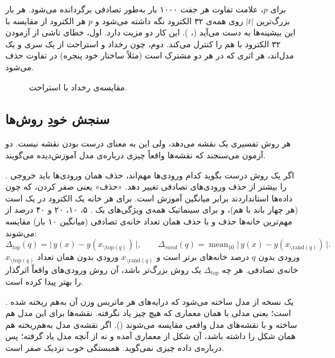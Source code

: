 برای $p$، علامت تفاوت هر جفت ۱۰۰۰ بار به‌طور تصادفی برگردانده می‌شود. هر بار بزرگ‌ترین $|t|$ روی همه‌ی ۳۲ الکترود نگه داشته می‌شود و $p$ هر الکترود از مقایسه با این بیشینه‌ها به دست می‌آید (، \cite{nichols2002}). این کار دو مزیت دارد. اول، خطای ناشی از آزمودن ۳۲ الکترود با هم را کنترل می‌کند. دوم، چون رخداد و استراحت از یک سری و یک مدل‌اند، هر اثری که در هر دو مشترک است (مثلاً ساختار خود پنجره) در تفاوت حذف می‌شود.

\begin{figure}[htbp]
\centering

\caption{مقایسه‌ی رخداد با استراحت.}
\end{figure}

\subsection{سنجش خودِ روش‌ها}

هر روش تفسیری یک نقشه می‌دهد، ولی این به معنای درست بودن نقشه نیست. دو آزمون می‌سنجند که نقشه‌ها واقعاً چیزی درباره‌ی مدل آموزش‌دیده می‌گویند.

\textbf{} \cite{samek2017}. اگر یک روش درست بگوید کدام ورودی‌ها مهم‌اند، حذف همان ورودی‌ها باید خروجی را بیشتر از حذف ورودی‌های تصادفی تغییر دهد. «حذف» یعنی صفر کردن، که چون داده‌ها استانداردند برابر میانگین آموزش است. برای  هر خانه یک الکترود در یک  است (هر چهار باند با هم)، و برای سینماتیک همه‌ی ویژگی‌های یک . ۵، ۱۰، ۲۰ و ۴۰ درصد از مهم‌ترین خانه‌ها حذف و با حذف همان تعداد خانه‌ی تصادفی (میانگین ۱۰ بار) مقایسه می‌شوند:
\begin{equation}
\Delta_{top}(q)=\big|\,y(x)-y(x_{\setminus \mathrm{top}(q)})\,\big|,\qquad \Delta_{rand}(q)=\operatorname{mean}_{10}\big|\,y(x)-y(x_{\setminus \mathrm{rand}(q)})\,\big|.
\end{equation}
$x_{\setminus \mathrm{top}(q)}$ ورودی بدون $q$ درصد خانه‌های برتر است و $x_{\setminus \mathrm{rand}(q)}$ ورودی بدون همان تعداد خانه‌ی تصادفی. هر چه $\Delta_{top}$ یک روش بزرگ‌تر باشد، آن روش ورودی‌های واقعاً اثرگذار را بهتر پیدا کرده است.

\textbf{} \cite{adebayo2018}. یک نسخه از مدل ساخته می‌شود که درایه‌های هر ماتریس وزن آن به‌هم ریخته شده است؛ یعنی مدلی با همان معماری که هیچ چیز یاد نگرفته. نقشه‌ها برای این مدل هم ساخته و با نقشه‌های مدل واقعی مقایسه می‌شوند (). اگر نقشه‌ی مدل به‌هم‌ریخته هم همان شکل را داشته باشد، آن شکل از معماری آمده و نه از آنچه مدل یاد گرفته؛ پس درباره‌ی داده چیزی نمی‌گوید. همبستگی خوب نزدیک صفر است.

